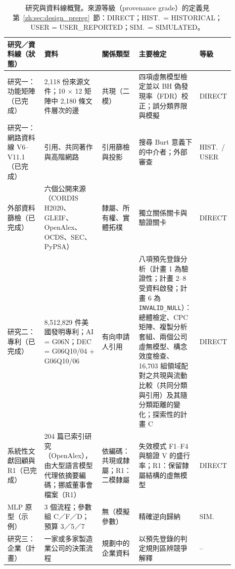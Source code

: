 \begin{table}[tbp]
\centering
\footnotesize
\setlength{\tabcolsep}{4pt}
\caption[研究與資料線概覽]{研究與資料線概覽。來源等級（provenance grade）的定義見第~\ref{zh:sec:design_prereg}~節：DIRECT；HIST.\ = HISTORICAL；USER = USER\_\allowbreak REPORTED；SIM.\ = SIMULATED。}
\label{zh:tab:front_overview}
\begin{tabular}{@{}p{0.16\linewidth}p{0.25\linewidth}p{0.16\linewidth}p{0.25\linewidth}p{0.09\linewidth}@{}}
\toprule
研究／資料線（狀態） & 資料 & 關係類型 & 主要檢定 & 等級 \tabularnewline
\midrule
\raggedright 研究一：功能矩陣（已完成） &
\raggedright 2,118 份來源文件；10 $\times$ 12 矩陣中 2,180 條文件層次的邊 &
\raggedright 共現（二模） &
\raggedright 四項虛無模型檢定並以 BH 偽發現率（FDR）校正；誤分類界限與模擬 &
\raggedright DIRECT \tabularnewline
\addlinespace
\raggedright 研究一：網路資料線 V6--V11.1（已完成） &
\raggedright 引用、共同著作與高階網路 &
\raggedright 引用篩檢與投影 &
\raggedright 搜尋 Burt 意義下的中介者；外部審查 &
\raggedright HIST.\ / USER \tabularnewline
\addlinespace
\raggedright 外部資料篩檢（已完成） &
\raggedright 六個公開來源（CORDIS H2020、GLEIF、OpenAlex、OCDS、SEC、PyPSA） &
\raggedright 隸屬、所有權、實體拓樸 &
\raggedright 獨立關係關卡與驗證關卡 &
\raggedright DIRECT \tabularnewline
\addlinespace
\raggedright 研究二：專利（已完成） &
\raggedright 8,512,829 件美國發明專利；AI = G06N；DEC = G06Q10/04 + G06Q10/06 &
\raggedright 有向申請人引用 &
\raggedright 八項預先登錄分析（計畫 1 為驗證性；計畫 2--8 受資料啟發；計畫 6 為 \texttt{INVALID\_\allowbreak NULL}）：總體檢定、CPC 矩陣、複製分析套組、兩個公司虛無模型、構念效度檢查、16,703 組領域配對之共現與流動比較（共同分類與引用）及其隨分類距離的變化；探索性的計畫 C &
\raggedright DIRECT \tabularnewline
\addlinespace
\raggedright 系統性文獻回顧與 R1（已完成） &
\raggedright 204 篇已索引研究（OpenAlex），由大型語言模型代理依摘要編碼；挪威董事會檔案（R1） &
\raggedright 依編碼：共現或隸屬；R1：二模隸屬 &
\raggedright 失效模式 F1--F4 與驗證 V 的盛行率；R1：保留隸屬結構的虛無模型 &
\raggedright DIRECT \tabularnewline
\addlinespace
\raggedright MLP 原型（示例） &
\raggedright 3 個流程；參數組 C／F／D；預算 3／5／7 &
\raggedright 無（模擬參數） &
\raggedright 精確逆向歸納 &
\raggedright SIM. \tabularnewline
\addlinespace
\raggedright 研究三：企業（計畫） &
\raggedright 一家或多家製造業公司的決策流程 &
\raggedright 規劃中的企業資料 &
\raggedright 以預先登錄的判定規則區辨競爭解釋 &
\raggedright -- \tabularnewline
\bottomrule
\end{tabular}
\end{table}

